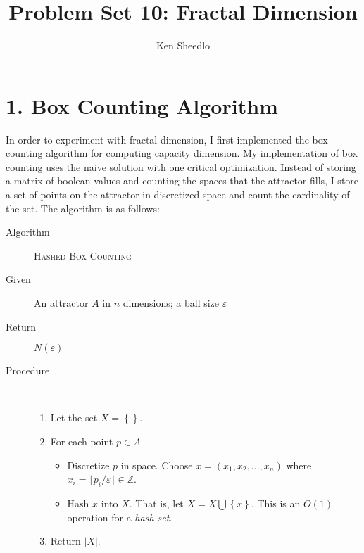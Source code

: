 \documentclass[12pt, letterpaper]{article}
\title{Problem Set 10: Fractal Dimension}
\author{Ken Sheedlo}
\begin{document}
\maketitle{}

\section*{1. Box Counting Algorithm}

In order to experiment with fractal dimension, I first implemented the box
counting algorithm for computing capacity dimension. My implementation of box
counting uses the naive solution with one critical optimization. Instead of 
storing a matrix of boolean values and counting the spaces that the attractor
fills, I store a set of points on the attractor in discretized space and count
the cardinality of the set. The algorithm is as follows:

\begin{description}
    \item[Algorithm] \textsc{Hashed Box Counting}
    \item[Given] An attractor $A$ in $n$ dimensions; a ball size $\varepsilon$
    \item[Return] $N(\varepsilon)$
    \item[Procedure] \ \vspace{0em} 
    \begin{enumerate}
        \item Let the set $X = \left\{\right\}$.
        \item For each point $p \in A$
        \begin{itemize}
            \item Discretize $p$ in space. Choose $x = (x_1, x_2, ..., x_n)$ where
                    $x_i = \lfloor p_i / \varepsilon\rfloor \in \mathbb{Z}$.
            \item Hash $x$ into $X$. That is, let $X = X \bigcup \left\{x\right\}$. This
                    is an $O(1)$ operation for a \emph{hash set}.
        \end{itemize}
        \item Return $|X|$.
    \end{enumerate}
\end{description}
\end{document}
